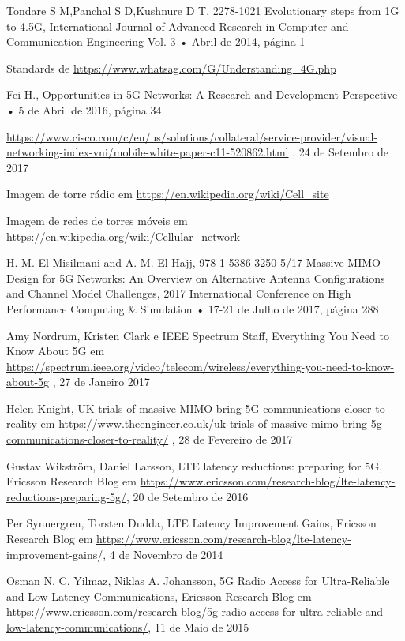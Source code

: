 \documentclass{llncs}
\begin{document}
%
%
\begin{thebibliography}{15}

Tondare S M,Panchal S D,Kushnure D T,
2278-1021
Evolutionary steps from 1G to 4.5G,
International Journal of Advanced Research in Computer and Communication Engineering Vol. 3
• Abril de 2014, página 1

Standards de \url{https://www.whatsag.com/G/Understanding_4G.php}

Fei H.,
Opportunities in 5G Networks: A Research and Development Perspective
• 5 de Abril de 2016, página 34

\url{https://www.cisco.com/c/en/us/solutions/collateral/service-provider/visual-networking-index-vni/mobile-white-paper-c11-520862.html}
, 24 de Setembro de 2017

Imagem de torre rádio em \url{https://en.wikipedia.org/wiki/Cell_site}

Imagem de redes de torres móveis em \url{https://en.wikipedia.org/wiki/Cellular_network}

H. M. El Misilmani and A. M. El-Hajj,
978-1-5386-3250-5/17
Massive MIMO Design for 5G Networks: An Overview on Alternative Antenna Configurations and Channel Model Challenges,
2017 International Conference on High Performance Computing \& Simulation
• 17-21 de Julho de 2017, página 288

Amy Nordrum, Kristen Clark e IEEE Spectrum Staff,
Everything You Need to Know About 5G em
\url{https://spectrum.ieee.org/video/telecom/wireless/everything-you-need-to-know-about-5g}
, 27 de Janeiro 2017

Helen Knight,
UK trials of massive MIMO bring 5G communications closer to reality em
\url{https://www.theengineer.co.uk/uk-trials-of-massive-mimo-bring-5g-communications-closer-to-reality/}
, 28 de Fevereiro de 2017

 Gustav Wikström, Daniel Larsson, LTE latency reductions: preparing for 5G, Ericsson Research Blog em \url{https://www.ericsson.com/research-blog/lte-latency-reductions-preparing-5g/}, 20 de Setembro de 2016

 Per Synnergren, Torsten Dudda, LTE Latency Improvement Gains, Ericsson Research Blog em \url{https://www.ericsson.com/research-blog/lte-latency-improvement-gains/}, 4 de Novembro de 2014

 Osman N. C. Yilmaz, Niklas A. Johansson, 5G Radio Access for Ultra-Reliable and Low-Latency Communications, Ericsson Research Blog em \url{https://www.ericsson.com/research-blog/5g-radio-access-for-ultra-reliable-and-low-latency-communications/}, 11 de Maio de 2015


\end{thebibliography}
\end{document}
